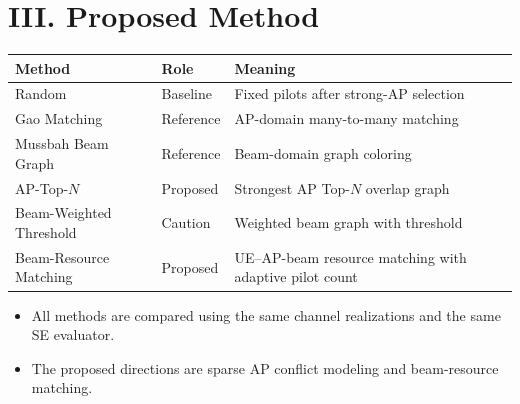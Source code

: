 \documentclass[aspectratio=169, 10pt]{beamer}
\newcommand{\methodBRM}{Beam-Resource Matching}
\newcommand{\methodTopN}{AP-Top-\(N\)}
\begin{document}
\section{III. Proposed Method}
\OnlyTitle
\begin{frame}{\insertsectionhead}
    \scriptsize
    \begin{tabular}{p{}p{}p{}}
        \toprule
        Method                  & Role      & Meaning                                                 \\
        \midrule
        Random                  & Baseline  & Fixed pilots after strong-AP selection                  \\
        Gao Matching            & Reference & AP-domain many-to-many matching                         \\
        Mussbah Beam Graph      & Reference & Beam-domain graph coloring                              \\
        \methodTopN{}           & Proposed  & Strongest AP Top-\(N\) overlap graph                    \\
        Beam-Weighted Threshold & Caution   & Weighted beam graph with threshold                      \\
        \methodBRM{}            & Proposed  & UE--AP-beam resource matching with adaptive pilot count \\
        \bottomrule
    \end{tabular}

    \vspace{0.3cm}
    \begin{itemize}
        \item All methods are compared using the same channel realizations and the same SE evaluator.
        \item The proposed directions are sparse AP conflict modeling and beam-resource matching.
    \end{itemize}
\end{frame}
\end{document}
